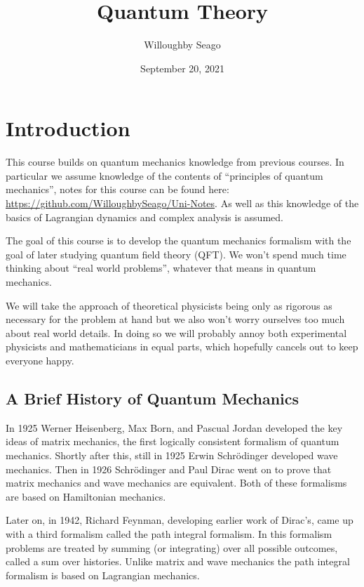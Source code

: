 \documentclass[fleqn]{NotesClass}
\title{Quantum Theory}
\author{Willoughby Seago}
\date{September 20, 2021}
\begin{document}
    \frontmatter
    \titlepage
    \tableofcontents
    \listoffigures
    \mainmatter
    
    \chapter{Introduction}
    This course builds on quantum mechanics knowledge from previous courses.
    In particular we assume knowledge of the contents of \enquote{principles of quantum mechanics}, notes for this course can be found here: \url{https://github.com/WilloughbySeago/Uni-Notes}.
    As well as this knowledge of the basics of Lagrangian dynamics and complex analysis is assumed.
    
    The goal of this course is to develop the quantum mechanics formalism with the goal of later studying quantum field theory (QFT).
    We won't spend much time thinking about \enquote{real world problems}, whatever that means in quantum mechanics.
    
    We will take the approach of theoretical physicists being only as rigorous as necessary for the problem at hand but we also won't worry ourselves too much about real world details.
    In doing so we will probably annoy both experimental physicists and mathematicians in equal parts, which hopefully cancels out to keep everyone happy.
    
    \section{A Brief History of Quantum Mechanics}
    In 1925 Werner Heisenberg, Max Born, and Pascual Jordan developed the key ideas of matrix mechanics, the first logically consistent formalism of quantum mechanics.
    Shortly after this, still in 1925 Erwin Schr\"odinger developed wave mechanics.
    Then in 1926 Schr\"odinger and Paul Dirac went on to prove that matrix mechanics and wave mechanics are equivalent.
    Both of these formalisms are based on Hamiltonian mechanics.
    
    Later on, in 1942, Richard Feynman, developing earlier work of Dirac's, came up with a third formalism called the path integral formalism.
    In this formalism problems are treated by summing (or integrating) over all possible outcomes, called a sum over histories.
    Unlike matrix and wave mechanics the path integral formalism is based on Lagrangian mechanics.
    
\end{document}
